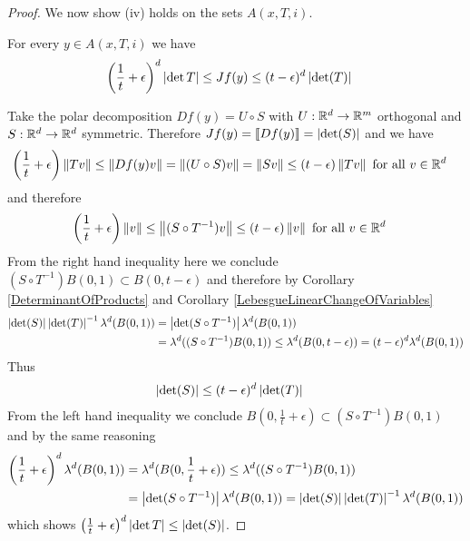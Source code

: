 \begin{proof}
We now show (iv) holds on the sets $A(x,T,i)$.
\begin{clm}For every $y \in A(x,T,i)$ we have
\begin{align*}
\left( \frac{1}{t} + \epsilon \right)^d \left \vert \det T \right \vert &\leq Jf(y) \leq (t-\epsilon)^d \left \vert \det(T) \right \vert
\end{align*}
\end{clm}
Take the polar decomposition $Df(y) = U \circ S$ with $U : \mathbb{R}^d \to \mathbb{R}^m$ orthogonal and $S : \mathbb{R}^d \to \mathbb{R}^d$ symmetric.  Therefore $Jf(y) = \llbracket Df(y) \rrbracket = \left \vert \det(S) \right \vert$ and we
have
\begin{align*}
\left( \frac{1}{t} + \epsilon \right) \left \lVert Tv \right \rVert &\leq \left \lVert Df(y) v \right \rVert = \left \lVert (U \circ S) v  \right \rVert =  \left \lVert S v \right \rVert \leq (t-\epsilon)\left \lVert Tv \right \rVert \text{ for all $v \in \mathbb{R}^d$}
\end{align*}
and therefore
\begin{align*}
\left( \frac{1}{t} + \epsilon \right) \left \lVert v \right \rVert &\leq \left \lVert (S \circ T^{-1}) v \right \rVert \leq (t-\epsilon)\left \lVert v \right \rVert \text{ for all $v \in \mathbb{R}^d$}
\end{align*}
From the right hand inequality here we conclude $(S \circ T^{-1}) B(0,1) \subset B(0, t-\epsilon)$ and therefore by Corollary \ref{DeterminantOfProducts} and  Corollary \ref{LebesgueLinearChangeOfVariables}
\begin{align*}
\left \vert \det(S) \right \vert \left \vert \det(T) \right \vert^{-1} \lambda^d(B(0,1)) &= \left \vert \det(S \circ T^{-1}) \right \vert \lambda^d(B(0,1)) \\
&= \lambda^d((S \circ T^{-1}) B(0,1)) \leq \lambda^d(B(0, t-\epsilon)) = (t-\epsilon)^d \lambda^d(B(0,1)) 
\end{align*}
Thus 
\begin{align*}
\left \vert \det(S) \right \vert  &\leq (t-\epsilon)^d \left \vert \det(T) \right \vert
\end{align*}
From the left hand inequality we conclude $B(0, \frac{1}{t} + \epsilon) \subset (S \circ T^{-1}) B(0,1)$ and by the same reasoning
\begin{align*}
\left( \frac{1}{t} + \epsilon \right)^d \lambda^d(B(0,1)) &= \lambda^d(B(0, \frac{1}{t} + \epsilon) ) \leq \lambda^d((S \circ T^{-1}) B(0,1)) \\
&= \left \vert \det(S \circ T^{-1}) \right \vert \lambda^d(B(0,1)) = \left \vert \det(S) \right \vert \left \vert \det(T) \right \vert^{-1} \lambda^d(B(0,1))
\end{align*}
which shows $\left( \frac{1}{t} + \epsilon \right)^d \left \vert \det T \right \vert \leq \left \vert \det(S) \right \vert$.  


\end{proof}
